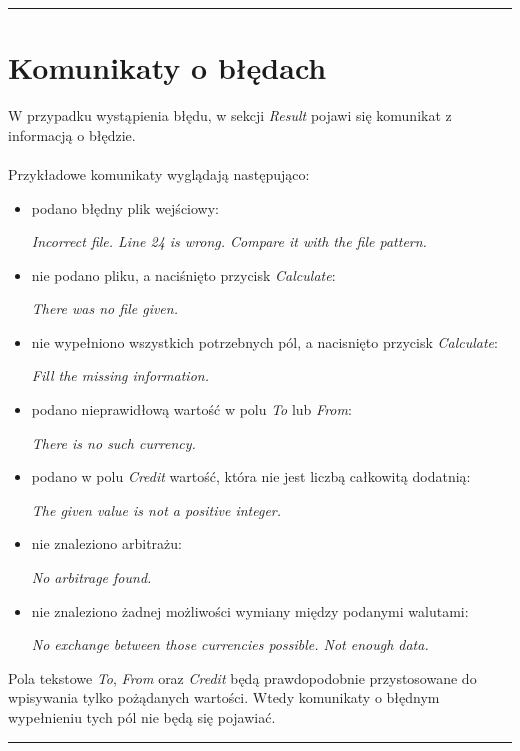 \documentclass[a4paper,11pt]{article}
\newcommand{\linia}{\rule{\linewidth}{0.4mm}}
\begin{document}
\noindent\linia
\section{Komunikaty o błędach}
W przypadku wystąpienia błędu, w sekcji \textit{Result} pojawi się komunikat z informacją o błędzie. 
\\\\
Przykładowe komunikaty wyglądają następująco:
\begin{itemize}
\item podano błędny plik wejściowy:

\textit{Incorrect file. Line 24 is wrong. Compare it with the file pattern.}
\item nie podano pliku, a naciśnięto przycisk \textit{Calculate}:

\textit{There was no file given.}
\item nie wypełniono wszystkich potrzebnych pól, a nacisnięto przycisk \textit{Calculate}:

\textit{Fill the missing information.}
\item podano nieprawidłową wartość w polu \textit{To} lub \textit{From}:

\textit{There is no such currency.}
\item podano w polu \textit{Credit} wartość, która nie jest liczbą całkowitą dodatnią:

\textit{The given value is not a positive integer.}
\item nie znaleziono arbitrażu:

\textit{No arbitrage found.}
\item nie znaleziono żadnej możliwości wymiany między podanymi walutami:

\textit{No exchange between those currencies possible. Not enough data.}
\end{itemize}
Pola tekstowe \textit{To}, \textit{From} oraz \textit{Credit} będą prawdopodobnie przystosowane do wpisywania tylko pożądanych wartości. Wtedy komunikaty o błędnym wypełnieniu tych pól nie będą się pojawiać.

\noindent\linia
\end{document}
